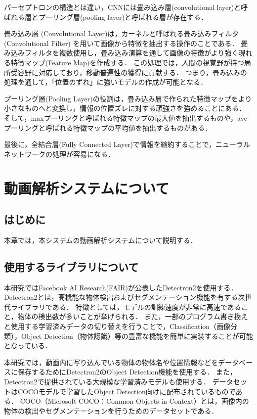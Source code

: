 \documentclass[a4j,12pt,dvipdfmx]{jreport}
\begin{document}
パーセプトロンの構造とは違い，CNNには畳み込み層(convolutional layer)と呼ばれる層とプーリング層(pooling layer)と呼ばれる層が存在する．

畳み込み層 (Convolutional Layer)は，カーネルと呼ばれる畳み込みフィルタ (Convolutional Filter) を用いて画像から特徴を抽出する操作のことである．
畳み込みフィルタを複数使用し，畳み込み演算を通して画像の特徴がより強く現れる特徴マップ(Feature Map)を作成する．
この処理では，人間の視覚野が持つ局所受容野に対応しており，移動普遍性の獲得に貢献する．
つまり，畳み込みの処理を通して，「位置のずれ」に強いモデルの作成が可能となる．

プーリング層(Pooling Layer)の役割は，畳み込み層で作られた特徴マップをより小さなものへと変換し，情報の位置ズレに対する頑強さを強めることにある．
そして，maxプーリングと呼ばれる特徴マップの最大値を抽出するものや，aveプーリングと呼ばれる特徴マップの平均値を抽出するものがある．

最後に，全結合層(Fully Connected Layer)で情報を縮約することで，ニューラルネットワークの処理が容易になる．

\clearpage

\chapter{動画解析システムについて}
\label{sec:system}
\section{はじめに}
本章では，本システムの動画解析システムについて説明する．

\section{使用するライブラリについて}
本研究ではFacebook AI Research(FAIR)が公表したDetectron2を使用する．
Detectron2とは，高機能な物体検出およびセグメンテーション機能を有する次世代ライブラリである．\cite{detectron2}
特徴としては，モデルの訓練速度が非常に高速であること，物体の検出数が多いことが挙げられる．
また，一部のプログラム書き換えと使用する学習済みデータの切り替えを行うことで，Classification（画像分類），Object Detection（物体認識）等の豊富な機能を簡単に実装することが可能となっている．

本研究では，動画内に写り込んでいる物体の物体名や位置情報などをデータベースに保存するためにDetectron2のObject Detection機能を使用する．
また，Detectron2で提供されている大規模な学習済みモデルも使用する．
データセットはCOCOモデルで学習したObject Detection向けに配布されているものである．
COCO（Microsoft COCO：Common Objects in Context）とは，画像内の物体の検出やセグメンテーションを行うためのデータセットである．\cite{coco}
\end{document}
